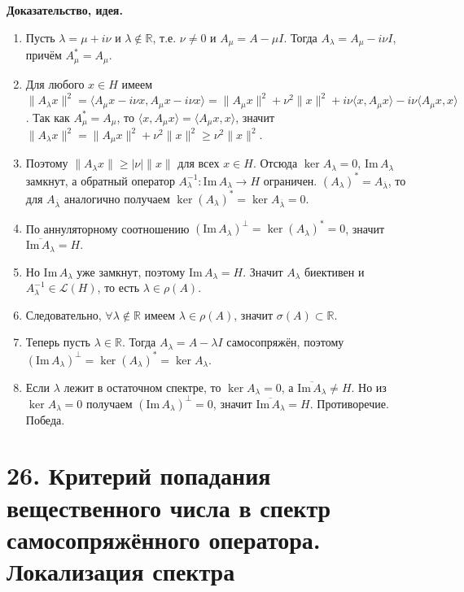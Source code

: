 \documentclass[10pt,a4paper]{article}
\begin{document}
	\textbf{Доказательство, идея.}
	\begin{enumerate}
		\item Пусть $\lambda=\mu+i\nu$ и $\lambda \notin \mathbb{R}$, т.е. $\nu \not = 0$ и $A_\mu=A-\mu I$. Тогда $A_\lambda=A_\mu-i\nu I$, причём $A_\mu^*=A_\mu$.

		\item Для любого $x\in H$ имеем $\|A_\lambda x\|^2=\langle A_\mu x-i\nu x,A_\mu x-i\nu x\rangle=\|A_\mu x\|^2+\nu^2\|x\|^2+i\nu\langle x,A_\mu x\rangle-i\nu\langle A_\mu x,x\rangle$. Так как $A_\mu^*=A_\mu$, то $\langle x,A_\mu x\rangle=\langle A_\mu x,x\rangle$, значит $\|A_\lambda x\|^2=\|A_\mu x\|^2+\nu^2\|x\|^2\ge\nu^2\|x\|^2$.

		\item Поэтому $\|A_\lambda x\|\ge |\nu|\|x\|$ для всех $x\in H$. Отсюда $\ker A_\lambda=0$, $\text{Im}\,A_\lambda$ замкнут, а обратный оператор $A_\lambda^{-1}:\text{Im}\,A_\lambda\to H$ ограничен. $(A_\lambda)^*=A_{\overline{\lambda}}$, то для $A_{\overline{\lambda}}$ аналогично получаем $\ker(A_\lambda)^*=\ker A_{\overline{\lambda}}=0$.

		\item По аннуляторному соотношению $(\text{Im}\,A_\lambda)^\perp=\ker(A_\lambda)^*=0$, значит $\overline{\text{Im}\,A_\lambda}=H$.

		\item Но $\text{Im}\,A_\lambda$ уже замкнут, поэтому $\text{Im}\,A_\lambda=H$. Значит $A_\lambda$ биективен и $A_\lambda^{-1}\in\mathcal L(H)$, то есть $\lambda\in\rho(A)$.

		\item Следовательно, $\forall\lambda\notin\mathbb R$ имеем $\lambda\in\rho(A)$, значит $\sigma(A)\subset\mathbb R$.

		\item Теперь пусть $\lambda\in\mathbb R$. Тогда $A_\lambda=A-\lambda I$ самосопряжён, поэтому $(\text{Im}\,A_\lambda)^\perp=\ker(A_\lambda)^*=\ker A_\lambda$.

		\item Если $\lambda$ лежит в остаточном спектре, то $\ker A_\lambda=0$, а $\overline{\text{Im}\,A_\lambda}\ne H$. Но из $\ker A_\lambda=0$ получаем $(\text{Im}\,A_\lambda)^\perp=0$, значит $\overline{\text{Im}\,A_\lambda}=H$. Противоречие. Победа.
	\end{enumerate}
	\section*{26. Критерий попадания вещественного числа в спектр самосопряжённого оператора. Локализация спектра}
\end{document}
